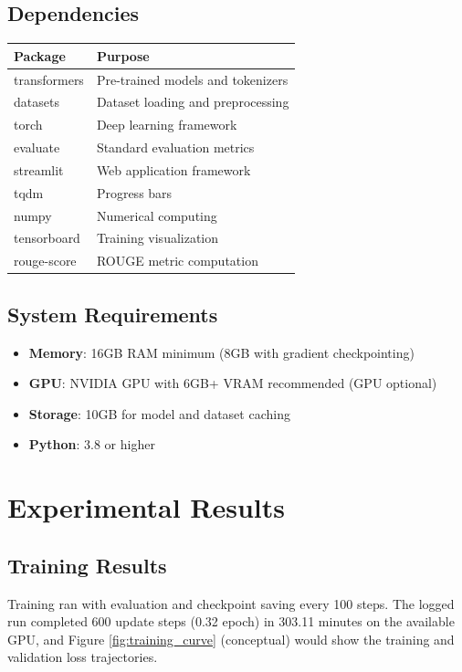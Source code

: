 \documentclass[12pt,a4paper,oneside]{report}
\begin{document}
\section{Dependencies}
\begin{table}[H]
\centering
\begin{tabular}{lp{8cm}}
\toprule
\textbf{Package} & \textbf{Purpose} \\
\midrule
transformers & Pre-trained models and tokenizers \\
datasets & Dataset loading and preprocessing \\
torch & Deep learning framework \\
evaluate & Standard evaluation metrics \\
streamlit & Web application framework \\
tqdm & Progress bars \\
numpy & Numerical computing \\
tensorboard & Training visualization \\
rouge-score & ROUGE metric computation \\
\bottomrule
\end{tabular}
\end{table}

\section{System Requirements}
\begin{itemize}
    \item \textbf{Memory}: 16GB RAM minimum (8GB with gradient checkpointing)
    \item \textbf{GPU}: NVIDIA GPU with 6GB+ VRAM recommended (GPU optional)
    \item \textbf{Storage}: 10GB for model and dataset caching
    \item \textbf{Python}: 3.8 or higher
\end{itemize}

\chapter{Experimental Results}
\label{ch:results}

\section{Training Results}
Training ran with evaluation and checkpoint saving every 100 steps. The logged run completed 600 update steps (0.32 epoch) in 303.11 minutes on the available GPU, and Figure \ref{fig:training_curve} (conceptual) would show the training and validation loss trajectories.
\end{document}
